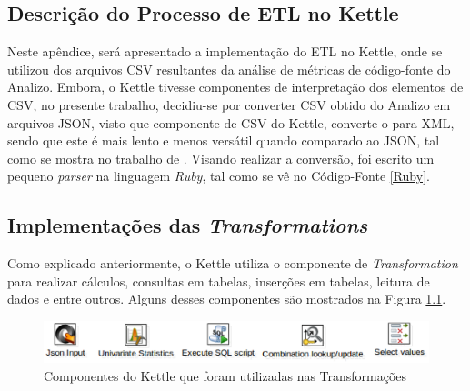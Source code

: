 \begin{apendicesenv}

\chapter{Descrição do Processo de ETL no Kettle}
\label{sec:implementação-etl}

Neste apêndice, será apresentado a implementação do ETL no Kettle, onde se utilizou dos arquivos CSV resultantes da análise de métricas de código-fonte do Analizo. Embora, o Kettle tivesse componentes de interpretação dos elementos de CSV, no presente trabalho, decidiu-se por converter CSV obtido do Analizo em arquivos JSON, visto que componente de CSV do Kettle, converte-o para XML, sendo que este é mais lento e menos versátil quando comparado ao JSON, tal como se mostra no trabalho de . Visando realizar a conversão, foi escrito um pequeno \textit{parser} na linguagem \textit{Ruby}, tal como se vê no Código-Fonte \ref{Ruby}.

\begin{center}
\begin{minipage}{0.5\textwidth}

\end{minipage}
\end{center}

\section{Implementações das \textit{Transformations}}


Como explicado anteriormente, o Kettle utiliza o componente de \textit{Transformation} para realizar cálculos, consultas em tabelas, inserções em tabelas, leitura de dados e entre outros. Alguns desses componentes são mostrados na Figura \ref{fig:components-etl}.


\begin{figure}[H]
\centering
\includegraphics[keepaspectratio=false,scale=0.60]{figuras/components-transformation.eps}
\caption{Componentes do Kettle que foram utilizadas nas Transformações}
\label{fig:components-etl}
\end{figure}
\FloatBarrier


\end{apendicesenv}

